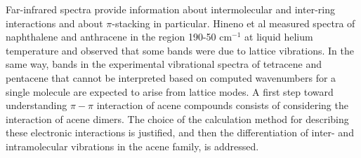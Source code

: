 Far-infrared spectra provide information about intermolecular and inter-ring interactions and about $\pi$-stacking in particular. Hineno et al \cite{hineno1975far}  measured spectra of naphthalene and anthracene in the region 190-50 cm$^{-1}$ at liquid helium temperature and observed that some bands were due to lattice vibrations. In the same way, bands in the experimental vibrational spectra of tetracene and pentacene that cannot be interpreted based on computed wavenumbers for a single molecule are expected to arise from lattice modes. A first step toward understanding $\pi -\pi$ interaction of acene compounds consists of considering the interaction of acene dimers. The choice of the calculation method for describing these electronic interactions is justified, and then the differentiation of inter- and intramolecular vibrations in the acene family, is addressed.\\

